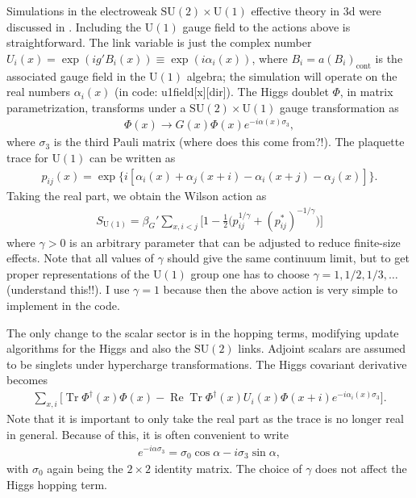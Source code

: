 \documentclass[11pt,a4paper]{article}
\newcommand\RE{\operatorname{Re}}
\newcommand\Tr{\operatorname{Tr}}
\newcommand\he[1]{#1^\dagger}%
\newcommand\gr[1]{\mathrm{#1}}%
\newcommand\lauri[1]{{\color{myorange}#1}}
\begin{document}
Simulations in the electroweak $\gr{SU(2) \times U(1)}$ effective theory in 3d were discussed in \cite{Kajantie:1996qd}. Including the $\gr{U(1)}$ gauge field to the actions above is straightforward. The link variable is just the complex number $U_i(x) = \exp(i g' B_i(x)) \equiv \exp(i \alpha_i(x))$, where $B_i = a (B_i)_\text{cont}$ is the associated gauge field in the $\gr{U(1)}$ algebra; the simulation will operate on the real numbers $\alpha_i(x)$ (in code: u1field[x][dir]). The Higgs doublet $\Phi$, in matrix parametrization, transforms under a $\gr{SU(2) \times U(1)}$ gauge transformation as 
\begin{align}
\Phi(x) \rightarrow G(x) \Phi(x) e^{-i \alpha(x)\sigma_3},
\end{align}
where $\sigma_3$ is the third Pauli matrix \lauri{(where does this come from?!)}. The plaquette trace for $\gr{U(1)}$ can be written as 
\begin{align}
p_{ij}(x) = \exp\{i[\alpha_i(x) + \alpha_j(x+i) - \alpha_i(x+j) - \alpha_j(x)]\}.
\end{align}
Taking the real part, we obtain the Wilson action as 
\begin{align}
S_\gr{U(1)} = \beta_G' \sum_{x, i<j} \Big[ 1 - \frac12 \Big(p_{ij}^{1/\gamma} + (p_{ij}^*)^{-1/\gamma}\Big)\Big] 
\end{align}
where $\gamma > 0$ is an arbitrary parameter that can be adjusted to reduce finite-size effects. Note that all values of $\gamma$ should give the same continuum limit, but to get proper representations of the $\gr{U(1)}$ group one has to choose  $\gamma = 1, 1/2, 1/3, \dots$ \lauri{(understand this!!)}. I use $\gamma = 1$ because then the above action is very simple to implement in the code.

The only change to the scalar sector is in the hopping terms, modifying update algorithms for the Higgs and also the $\gr{SU(2)}$ links. \lauri{Adjoint scalars are assumed to be singlets under hypercharge transformations.} The Higgs covariant derivative becomes 
\begin{align}
\sum_{x, i} \Big[ \Tr \he\Phi(x)\Phi(x) - \RE\Tr \he\Phi(x)U_i(x)\Phi(x+i)e^{-i \alpha_i(x)\sigma_3}\Big].
\end{align}
Note that it is important to only take the real part as the trace is no longer real in general. Because of this, it is often convenient to write 
\begin{align}
e^{-i \alpha\sigma_3} = \sigma_0\cos\alpha - i \sigma_3 \sin\alpha,
\end{align}
with $\sigma_0$ again being the $2\times 2$ identity matrix. The choice of $\gamma$ does not affect the Higgs hopping term.
\end{document}
